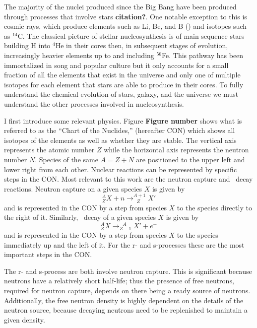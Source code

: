 The majority of the nuclei produced since the Big Bang have been
produced through processes that involve stars {\bf citation?}.  One
notable exception to this is cosmic rays, which produce elements such
as Li, Be, and B (\citealt{meneguzzi1971}) and isotopes such as
$^{14}$C.  The classical picture of stellar nucleosynthesis is of main
sequence stars
building H into $^4$He in their cores then, in subsequent stages of
evolution, increasingly heavier elements up to and including
$^{56}$Fe. This pathway has been immortalized in song and popular
culture but it only accounts for a small fraction of all the elements
that exist in the universe and only one of multiple isotopes for each
element that stars are able to produce in their cores.  To fully
understand the chemical evolution of stars, galaxy, and the universe
we must understand the other processes involved in nucleosynthesis.

I first introduce some relevant physics.  Figure {\bf Figure number}
shows what is referred to as the ``Chart of the Nuclides,'' (hereafter
CON) which
shows all isotopes of the elements as well as whether they are
stable.  The vertical axis represents the atomic number $Z$ while the
horizontal axis represents the neutron number $N$.  Species of the
same $A=Z+N$ are positioned to the upper left and lower right from
each other.  Nuclear reactions can be represented by specific steps in
the CON.  Most relevant to this work are the neutron
capture and \bminus\ decay reactions.  Neutron capture on a given
species $X$ is given by
\begin{equation}
\label{eq:nc}
^{A}_ZX + n \rightarrow ^{A+1}_{\ \ \ Z}X'
\end{equation}
and is represented in the CON by a step from species $X$ to the
species directly to the right of it.  Similarly, \bminus\ decay of a
given species $X$ is given by
\begin{equation}
\label{eq:bd}
^{A}_ZX  \rightarrow ^{\ \ \ A}_{Z-1}X' + e^-
\end{equation}
and is represented in the CON by a step from species $X$ to the
species immediately up and the left of it.  For the r- and s-processes
these are the most important steps in the CON.

The r- and s-process are both involve neutron capture.  This is
significant because neutrons have a relatively short half-life; thus
the presence of free neutrons, required for neutron capture, depends
on there being a ready source of neutrons.  Additionally, the free
neutron density is highly dependent on the details of the neutron
source, because decaying neutrons need to be replenished to maintain a
given density.